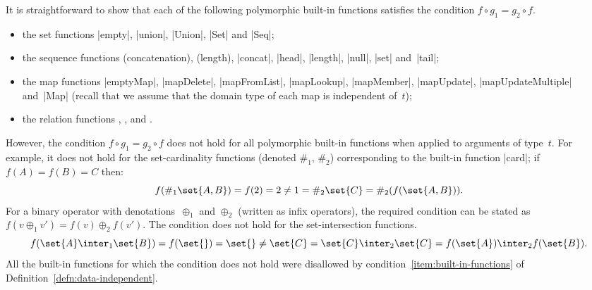 It is straightforward to show that each of the following polymorphic built-in
functions satisfies the condition $f \circ g_1 = g_2 \circ f$.
%
\begin{itemize}
\item the set functions |empty|, |union|, |Union|, |Set| and |Seq|;

\item the sequence functions \CSPM{^} (concatenation), \CSPM{#} (length),
  |concat|, |head|, |length|, |null|, |set| and~|tail|;

\item the map functions |emptyMap|, |mapDelete|, |mapFromList|, |mapLookup|,
  |mapMember|, |mapUpdate|, |mapUpdateMultiple| and~|Map| (recall that we
  assume that the domain type of each map is independent of~$t$);

\item the relation functions ,
  , and .
\end{itemize}

However, the condition $f \circ g_1 = g_2 \circ f$ does not hold for all
polymorphic built-in functions when applied to arguments of type~$t$.  For
example, it does not hold for the set-cardinality functions (denoted $\#_1$,
$\#_2$) corresponding to the built-in function |card|; if $f(A) = f(B) = C$
then:
\[
f(\#_1\set{A,B}) = f(2) = 2 \ne 1 = \#_2\set{C} = \#_2(f(\set{A,B})).
\]
For a binary operator with denotations~$\oplus_1$ and $\oplus_2$ (written as
infix operators), the required condition can be stated as $f(v \oplus_1 v') =
f(v) \oplus_2 f(v')$.  The condition does not hold for the set-intersection
functions.
\[
f(\set{A} \inter_1 \set{B}) = f(\set{}) = \set{} \ne \set{C} 
  = \set{C} \inter_2 \set{C} = f(\set{A}) \inter_2 f(\set{B}).
\]
All the built-in functions for which the condition does not hold were
disallowed by condition~\ref{item:built-in-functions} of
Definition~\ref{defn:data-independent}.





